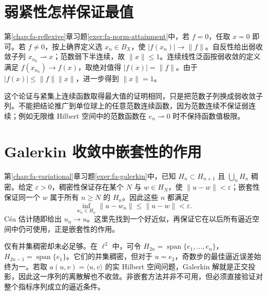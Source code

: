\documentclass[UTF8,12pt,a4paper,fontset=fandol]{ctexbook}
\begin{document}
\section{弱紧性怎样保证最值}
第\ref{chap:fa-reflexive}章习题\ref{exer:fa-norm-attainment}中，若 $f=0$，任取 $x=0$ 即可。若 $f\ne0$，按上确界定义选 $x_n\in B_X$，使 $|f(x_n)|\to\|f\|$。自反性给出弱收敛子列 $x_{n_k}\rightharpoonup x$；范数弱下半连续，故 $\|x\|\leq1$。连续线性泛函按弱收敛的定义满足 $f(x_{n_k})\to f(x)$，取绝对值得 $|f(x)|=\|f\|$。由于 $|f(x)|\leq\|f\|\|x\|$，进一步得到 $\|x\|=1$。

这个论证与紧集上连续函数取得最大值的证明相同，只是把范数子列换成弱收敛子列。不能把结论推广到单位球上的任意范数连续函数，因为范数连续不保证弱连续；例如无限维 Hilbert 空间中的范数函数在 $e_n\rightharpoonup0$ 时不保持函数值极限。

\section{Galerkin 收敛中嵌套性的作用}
第\ref{chap:fa-variational}章习题\ref{exer:fa-galerkin}中，已知 $H_n\subset H_{n+1}$ 且 $\bigcup_nH_n$ 稠密。给定 $\varepsilon>0$，稠密性保证存在某个 $N$ 与 $w\in H_N$，使 $\|u-w\|<\varepsilon$；嵌套性保证同一个 $w$ 属于所有 $n\geq N$ 的 $H_n$。因此这些 $n$ 都满足
\[
 \inf_{w_n\in H_n}\|u-w_n\|\leq\|u-w\|<\varepsilon.
\]
Céa 估计随即给出 $u_n\to u$。这里先找到一个好近似，再保证它在以后所有逼近空间中仍可使用，正是嵌套性的作用。

仅有并集稠密却未必足够。在 $\ell^2$ 中，可令 $H_{2n}=\operatorname{span}\{e_1,\ldots,e_n\}$，$H_{2n-1}=\operatorname{span}\{e_1\}$。它们的并集稠密，但对于 $u=e_2$，奇数步的最佳逼近误差始终为一。若取 $a(u,v)=\langle u,v\rangle$ 的实 Hilbert 空间问题，Galerkin 解就是正交投影，因此这一序列的离散解也不收敛。非嵌套方法并非不可用，但必须直接验证对整个指标序列成立的逼近条件。
\end{document}
